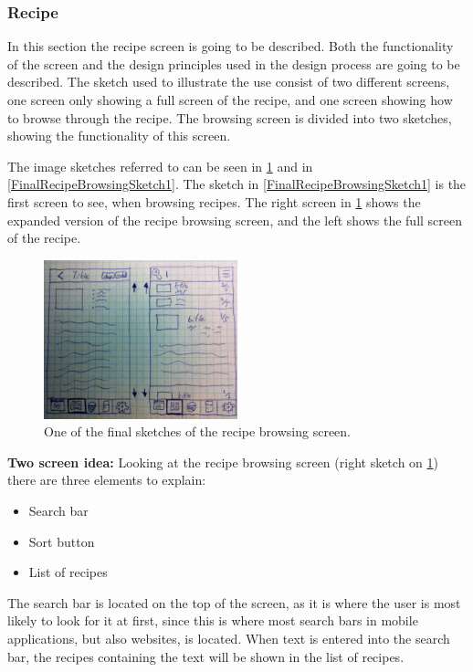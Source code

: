 \subsubsection{Recipe} \label{RecipesSketches}
In this section the recipe screen is going to be described. Both the functionality of the screen and the design principles used in the design process are going to be described. The sketch used to illustrate the use consist of two different screens, one screen only showing a full screen of the recipe, and one screen showing how to browse through the recipe. The browsing screen is divided into two sketches, showing the functionality of this screen.

The image sketches referred to can be seen in \cref{FinalRecipeBrowsingSketch2} and in \cref{FinalRecipeBrowsingSketch1}. The sketch in \cref{FinalRecipeBrowsingSketch1} is the first screen to see, when browsing recipes. The right screen in \cref{FinalRecipeBrowsingSketch2} shows the expanded version of the recipe browsing screen, and the left shows the full screen of the recipe.

\begin{figure}[H]
    \centering
    \includegraphics[width=0.5\textwidth]{Grafik/FoodPlanner/FinalRecipeBrowsingSketch2}
    \caption{One of the final sketches of the recipe browsing screen.}
    \label{FinalRecipeBrowsingSketch2}
\end{figure}

\textbf{Two screen idea:} Looking at the recipe browsing screen (right sketch on \cref{FinalRecipeBrowsingSketch2}) there are three elements to explain: 

\begin{itemize}
    \item Search bar
    \item Sort button
    \item List of recipes
\end{itemize}

The search bar is located on the top of the screen, as it is where the user is most likely to look for it at first, since this is where most search bars in mobile applications, but also websites, is located. When text is entered into the search bar, the recipes containing the text will be shown in the list of recipes. 

